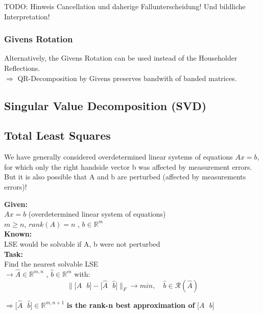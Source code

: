 \documentclass[12pt, a4paper]{article}
\newcommand{\R}{\mathbb{R}}
\begin{document}
TODO: Hinweis Cancellation und daherige Fallunterscheidung! Und bildliche Interpretation!

\subsubsection{Givens Rotation}

Alternatively, the Givens Rotation can be used instead of the Householder Reflections. \\

$\Rightarrow$ QR-Decomposition by Givens preserves bandwith of banded matrices.
 
\subsection{Singular Value Decomposition (SVD)}




\subsection{Total Least Squares}
We have generally considered overdetermined linear systems of equations $Ax = b$, for which only the right handside vector b was affected by measurement errors. But it is also possible that A and b are perturbed (affected by measurements errors)!

\begin{tcolorbox}
\textbf{Given:}\\
$Ax = b$ (overdetermined linear system of equations) \\
$m \geq n$, $rank(A)=n$ ,  $b \in \R^{m}$\vspace{2mm}\\
\textbf{Known:}  \\
LSE would be solvable if A, b were not perturbed  \vspace{2mm}\\
\textbf{Task:} \\
Find the nearest solvable LSE \\
$\rightarrow  \hat A \in \R^{m,n}$ ,  $\hat b \in \R^{m}$ with: \\
\[ \lVert \lbrack A \text{ }b \rbrack - \lbrack \hat A \text{ } \hat b \rbrack\rVert_{F} \rightarrow min, \quad \hat b \in \mathcal{R}(\hat A) \] 
\end{tcolorbox}


$\Rightarrow \lbrack \hat A \text{ } \hat b \rbrack \in \R^{m, n+1}$ \textbf{is the rank-n best approximation of}  $\lbrack A \text{ }b \rbrack$ \\
\end{document}
